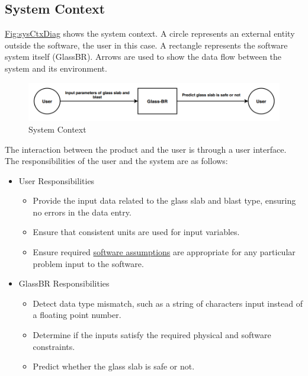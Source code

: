 \documentclass[12pt]{article}
\begin{document}
\subsection{System Context}
\label{Sec:SysContext}
\hyperref[Figure:sysCtxDiag]{Fig:sysCtxDiag} shows the system context. A circle represents an external entity outside the software, the user in this case. A rectangle represents the software system itself (GlassBR). Arrows are used to show the data flow between the system and its environment.

\begin{figure}
\begin{center}
\includegraphics[width=\textwidth]{../../../../datafiles/glassbr/SystemContextFigure.png}
\caption{System Context}
\label{Figure:sysCtxDiag}
\end{center}
\end{figure}
The interaction between the product and the user is through a user interface. The responsibilities of the user and the system are as follows:

\begin{itemize}
\item{User Responsibilities}
\begin{itemize}
\item{Provide the input data related to the glass slab and blast type, ensuring no errors in the data entry.}
\item{Ensure that consistent units are used for input variables.}
\item{Ensure required \hyperref[Sec:Assumps]{software assumptions} are appropriate for any particular problem input to the software.}
\end{itemize}
\item{GlassBR Responsibilities}
\begin{itemize}
\item{Detect data type mismatch, such as a string of characters input instead of a floating point number.}
\item{Determine if the inputs satisfy the required physical and software constraints.}
\item{Predict whether the glass slab is safe or not.}
\end{itemize}
\end{itemize}
\end{document}
